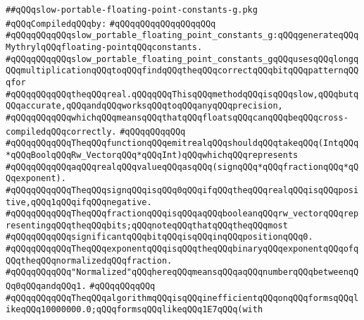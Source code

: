 \label{src/lib/compiler/src/fconst/slow-portable-floating-point-constants-g.pkg}
\verb|##qQQqslow-portable-floating-point-constants-g.pkg|\newline
\newline
\verb|#qQQqCompiledqQQqby:|\newline
\verb|#qQQqqQQqqQQqqQQqqQQq|\newline
\newline
\newline
\newline
\verb|#qQQqqQQqqQQqslow_portable_floating_point_constants_g:qQQqgenerateqQQqMythrylqQQqfloating-pointqQQqconstants.|\newline
\verb|#qQQqqQQqqQQqslow_portable_floating_point_constants_gqQQqusesqQQqlongqQQqmultiplicationqQQqtoqQQqfindqQQqtheqQQqcorrectqQQqbitqQQqpatternqQQqfor|\newline
\verb|#qQQqqQQqqQQqtheqQQqreal.qQQqqQQqThisqQQqmethodqQQqisqQQqslow,qQQqbutqQQqaccurate,qQQqandqQQqworksqQQqtoqQQqanyqQQqprecision,|\newline
\verb|#qQQqqQQqqQQqwhichqQQqmeansqQQqthatqQQqfloatsqQQqcanqQQqbeqQQqcross-compiledqQQqcorrectly.|\newline
\verb|#qQQqqQQqqQQq|\newline
\verb|#qQQqqQQqqQQqTheqQQqfunctionqQQqemitrealqQQqshouldqQQqtakeqQQq(IntqQQq*qQQqBoolqQQqRw_VectorqQQq*qQQqInt)qQQqwhichqQQqrepresents|\newline
\verb|#qQQqqQQqqQQqaqQQqrealqQQqvalueqQQqasqQQq(signqQQq*qQQqfractionqQQq*qQQqexponent).|\newline
\verb|#qQQqqQQqqQQqTheqQQqsignqQQqisqQQq0qQQqifqQQqtheqQQqrealqQQqisqQQqpositive,qQQq1qQQqifqQQqnegative.|\newline
\verb|#qQQqqQQqqQQqTheqQQqfractionqQQqisqQQqaqQQqbooleanqQQqrw_vectorqQQqrepresentingqQQqtheqQQqbits;qQQqnoteqQQqthatqQQqtheqQQqmost|\newline
\verb|#qQQqqQQqqQQqsignificantqQQqbitqQQqisqQQqinqQQqpositionqQQq0.|\newline
\verb|#qQQqqQQqqQQqTheqQQqexponentqQQqisqQQqtheqQQqbinaryqQQqexponentqQQqofqQQqtheqQQqnormalizedqQQqfraction.|\newline
\verb|#qQQqqQQqqQQq"Normalized"qQQqhereqQQqmeansqQQqaqQQqnumberqQQqbetweenqQQq0qQQqandqQQq1.|\newline
\verb|#qQQqqQQqqQQq|\newline
\verb|#qQQqqQQqqQQqTheqQQqalgorithmqQQqisqQQqinefficientqQQqonqQQqformsqQQqlikeqQQq10000000.0;qQQqformsqQQqlikeqQQq1E7qQQq(with|\newline
